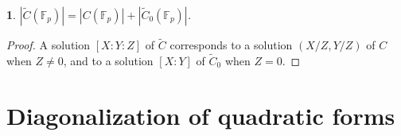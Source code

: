 \documentclass[10pt,a4paper]{amsart}
\numberwithin{equation}{section}
\numberwithin{figure}{section}
\theoremstyle{definition}
\theoremstyle{remark}
\theoremstyle{plain}
\theoremstyle{plain}
\theoremstyle{definition}
\theoremstyle{plain}
\theoremstyle{plain}
\newtheorem{lem}{\protect\lemmaname}[section]
\providecommand{\lemmaname}{Lemma}
\newcommand{\F}{\mathbb{F}}
\begin{document}
    \begin{lem}\label{lem:relate-solutions-affine-proj}
        $|\widetilde{C}(\F_p)| = |C(\F_p)| + |\widetilde{C}_0(\F_p)|$.
    \end{lem} 
    \begin{proof}
        A solution $[X:Y:Z]$ of $\widetilde{C}$ corresponds 
        to a solution $(X/Z,Y/Z)$ of $C$ when $Z \neq 0$,
        and to a solution $[X:Y]$ of $\widetilde{C}_0$ 
        when $Z = 0$.  
    \end{proof}

    \section{Diagonalization of quadratic forms}
    \label{sec:diagonalizing-quadratic-forms} 
\end{document}
